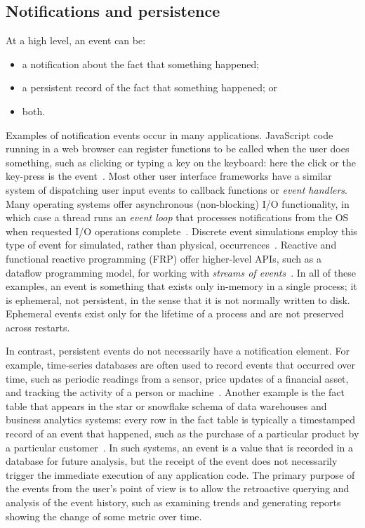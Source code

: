 \documentclass[sigconf]{acmart}
\begin{document}
\subsection{Notifications and persistence}

At a high level, an event can be:
\begin{itemize}
\item a notification about the fact that something happened;
\item a persistent record of the fact that something happened; or
\item both.
\end{itemize}

Examples of notification events occur in many applications.
JavaScript code running in a web browser can register functions to be called when the user does something, such as clicking or typing a key on the keyboard: here the click or the key-press is the event~\cite{MDNEvents}.
Most other user interface frameworks have a similar system of dispatching user input events to callback functions or \emph{event handlers}.
Many operating systems offer asynchronous (non-blocking) I/O functionality, in which case a thread runs an \emph{event loop} that processes notifications from the OS when requested I/O operations complete~\cite{select-syscall}.
Discrete event simulations employ this type of event for simulated, rather than physical, occurrences~\cite{Misra:1986}.
Reactive and functional reactive programming (FRP) offer higher-level APIs, such as a dataflow programming model, for working with \emph{streams of events}~\cite{Bainomugisha:2013,Czaplicki:2013}.
In all of these examples, an event is something that exists only in-memory in a single process; it is ephemeral, not persistent, in the sense that it is not normally written to disk.
Ephemeral events exist only for the lifetime of a process and are not preserved across restarts.

In contrast, persistent events do not necessarily have a notification element.
For example, time-series databases are often used to record events that occurred over time, such as periodic readings from a sensor, price updates of a financial asset, and tracking the activity of a person or machine~\cite{Kulkarni:2020}.
Another example is the fact table that appears in the star or snowflake schema of data warehouses and business analytics systems: every row in the fact table is typically a timestamped record of an event that happened, such as the purchase of a particular product by a particular customer~\cite{Kimball:2013}.
In such systems, an event is a value that is recorded in a database for future analysis, but the receipt of the event does not necessarily trigger the immediate execution of any application code.
The primary purpose of the events from the user's point of view is to allow the retroactive querying and analysis of the event history, such as examining trends and generating reports showing the change of some metric over time.
\end{document}
